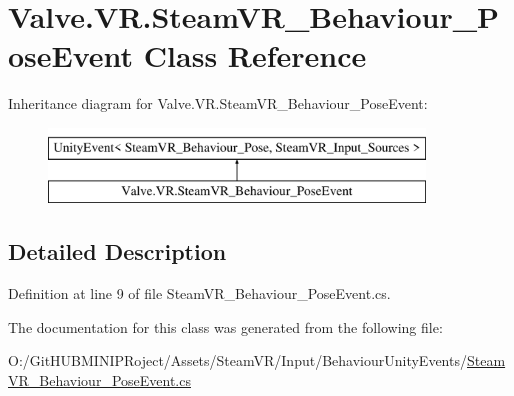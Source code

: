 \hypertarget{class_valve_1_1_v_r_1_1_steam_v_r___behaviour___pose_event}{}\section{Valve.\+V\+R.\+Steam\+V\+R\+\_\+\+Behaviour\+\_\+\+Pose\+Event Class Reference}
\label{class_valve_1_1_v_r_1_1_steam_v_r___behaviour___pose_event}
Inheritance diagram for Valve.\+V\+R.\+Steam\+V\+R\+\_\+\+Behaviour\+\_\+\+Pose\+Event\+:\begin{figure}[H]
\begin{center}
\leavevmode
\includegraphics[height=2.000000cm]{class_valve_1_1_v_r_1_1_steam_v_r___behaviour___pose_event}
\end{center}
\end{figure}


\subsection{Detailed Description}


Definition at line 9 of file Steam\+V\+R\+\_\+\+Behaviour\+\_\+\+Pose\+Event.\+cs.



The documentation for this class was generated from the following file\+:\begin{DoxyCompactItemize}
\item 
O\+:/\+Git\+H\+U\+B\+M\+I\+N\+I\+P\+Roject/\+Assets/\+Steam\+V\+R/\+Input/\+Behaviour\+Unity\+Events/\mbox{\hyperlink{_steam_v_r___behaviour___pose_event_8cs}{Steam\+V\+R\+\_\+\+Behaviour\+\_\+\+Pose\+Event.\+cs}}\end{DoxyCompactItemize}
